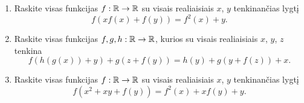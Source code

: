 \begin{enumerate}
  \item Raskite visas funkcijas $f: \mathbb R \to \mathbb R$ su visais realiaisiais $x$,
    $y$ tenkinančias lygtį $$f(xf(x)+f(y))=f^2(x)+y.$$
  \item Raskite visas funkcijas $f,g,h:\mathbb R\to\mathbb R$, kurios su visais
    realiaisiais $x$, $y$, $z$ tenkina $$f(h(g(x))
    +y)+g(z+f(y))=h(y)+g(y+f(z))+x.$$
 \item Raskite visas funkcijas $f: \mathbb R \to \mathbb R$ su visais realiaisiais $x$,
    $y$ tenkinančias lygtį $$f(x^2 + xy +f(y))=f^2(x)+xf(y)+y.$$

\end{enumerate}
